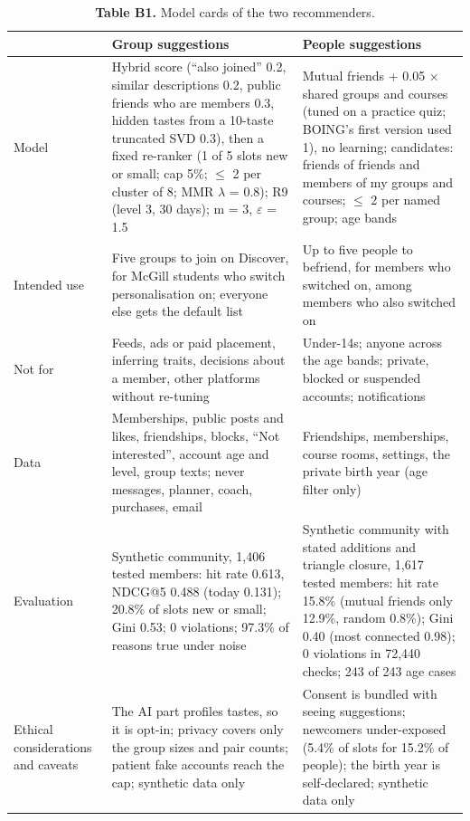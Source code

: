 \documentclass[11pt,letterpaper]{article}
\newcommand{\rowrule}{\midrule[0.2pt]}
\begin{document}
\begin{table}[!htbp]
\centering
\caption*{\textbf{Table B1.} Model cards of the two recommenders.}
\scriptsize
\begin{tabular}{
  >{\raggedright\arraybackslash}p{}
  >{\raggedright\arraybackslash}p{}
  >{\raggedright\arraybackslash}p{}
}
\toprule
{} & \textbf{Group suggestions} & \textbf{People suggestions} \\
\midrule
Model & Hybrid score (``also joined'' 0.2, similar descriptions 0.2, public friends who are members 0.3, hidden tastes from a 10-taste truncated SVD 0.3), then a fixed re-ranker (1 of 5 slots new or small; cap 5\%; $\leq$ 2 per cluster of 8; MMR $\lambda$ = 0.8); R9 (level 3, 30 days); m = 3, $\varepsilon$ = 1.5 & Mutual friends + 0.05 $\times$ shared groups and courses (tuned on a practice quiz; BOING's first version used 1), no learning; candidates: friends of friends and members of my groups and courses; $\leq$ 2 per named group; age bands \\
\rowrule
Intended use & Five groups to join on Discover, for McGill students who switch personalisation on; everyone else gets the default list & Up to five people to befriend, for members who switched on, among members who also switched on \\
\rowrule
Not for & Feeds, ads or paid placement, inferring traits, decisions about a member, other platforms without re-tuning & Under-14s; anyone across the age bands; private, blocked or suspended accounts; notifications \\
\rowrule
Data & Memberships, public posts and likes, friendships, blocks, ``Not interested'', account age and level, group texts; never messages, planner, coach, purchases, email & Friendships, memberships, course rooms, settings, the private birth year (age filter only) \\
\rowrule
Evaluation & Synthetic community, 1,406 tested members: hit rate 0.613, NDCG@5 0.488 (today 0.131); 20.8\% of slots new or small; Gini 0.53; 0 violations; 97.3\% of reasons true under noise & Synthetic community with stated additions and triangle closure, 1,617 tested members: hit rate 15.8\% (mutual friends only 12.9\%, random 0.8\%); Gini 0.40 (most connected 0.98); 0 violations in 72,440 checks; 243 of 243 age cases \\
\rowrule
Ethical considerations and caveats & The AI part profiles tastes, so it is opt-in; privacy covers only the group sizes and pair counts; patient fake accounts reach the cap; synthetic data only & Consent is bundled with seeing suggestions; newcomers under-exposed (5.4\% of slots for 15.2\% of people); the birth year is self-declared; synthetic data only \\
\bottomrule
\end{tabular}
\end{table}
\end{document}
